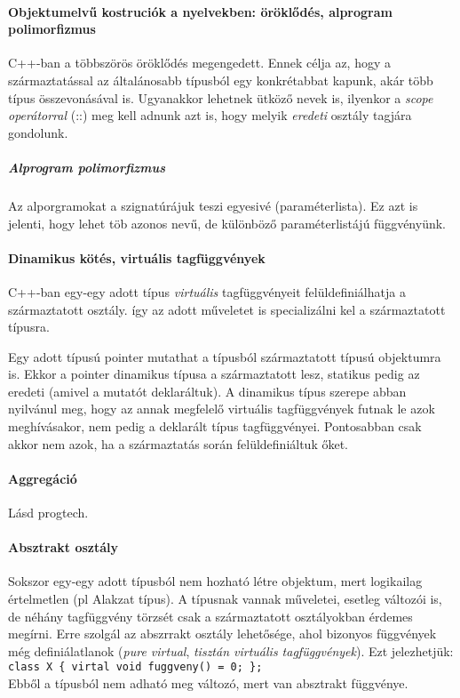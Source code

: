 \documentclass[fleqn,10pt,a4paper]{article}
\newcommand{\ut}[1]{\texttt{#1}}
\theoremstyle{magyar}
\begin{document}
  \paragraph[Objektumelvű konstrukciók]{Objektumelvű kostruciók a
    nyelvekben: öröklődés, alprogram polimorfizmus}
  C++-ban a többszörös öröklődés megengedett.  Ennek célja az, hogy a
  származtatással az általánosabb típusból egy konkrétabbat kapunk,
  akár több típus összevonásával is. Ugyanakkor lehetnek ütköző nevek
  is, ilyenkor a \emph{scope operátorral} (::) meg kell adnunk azt is,
  hogy melyik \emph{eredeti} osztály tagjára gondolunk.
  \subparagraph{Alprogram polimorfizmus}
  Az alporgramokat a szignatúrájuk teszi egyesivé (paraméterlista). Ez
  azt is jelenti, hogy lehet töb azonos nevű, de különböző
  paraméterlistájú függvényünk. 
  \paragraph{Dinamikus kötés, virtuális tagfüggvények}
  C++-ban egy-egy adott típus \emph{virtuális} tagfüggvényeit
  felüldefiniálhatja a származtatott osztály.
  így az adott műveletet is specializálni kel a származtatott típusra.

  Egy adott típusú pointer mutathat a típusból származtatott
  típusú objektumra is. Ekkor a pointer dinamikus típusa a
  származtatott lesz, statikus pedig az eredeti (amivel a mutatót
  deklaráltuk). A dinamikus típus szerepe abban nyilvánul meg, hogy az
  annak megfelelő virtuális tagfüggvények futnak le azok meghívásakor,
  nem pedig a deklarált típus tagfüggvényei. Pontosabban csak akkor
  nem azok, ha a származtatás során felüldefiniáltuk őket.

  \paragraph{Aggregáció}
  Lásd progtech.

  \paragraph{Absztrakt osztály}
  Sokszor egy-egy adott típusból nem hozható létre objektum, mert
  logikailag értelmetlen (pl Alakzat típus). A típusnak vannak
  műveletei, esetleg változói is, de néhány tagfüggvény törzsét csak a
  származtatott osztályokban érdemes megírni. Erre szolgál az abszrrakt
  osztály lehetősége, ahol bizonyos függvények még definiálatlanok
  (\emph{pure virtual}, \emph{tisztán virtuális tagfüggvények}). Ezt
  jelezhetjük:\\
  \ut{class X \{ virtal void fuggveny() = 0; \};}\\
  Ebből a típusból nem adható meg változó, mert van absztrakt függvénye.
  
\end{document}

